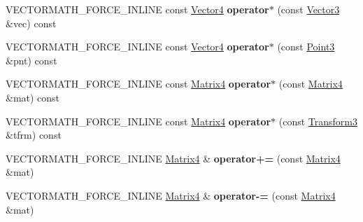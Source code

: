 \begin{DoxyCompactItemize}
\item 
\mbox{\label{classVectormath_1_1Aos_1_1Matrix4_a55560ef07894bfa1086be365141c36a2}} 
V\+E\+C\+T\+O\+R\+M\+A\+T\+H\+\_\+\+F\+O\+R\+C\+E\+\_\+\+I\+N\+L\+I\+NE const \hyperlink{classVectormath_1_1Aos_1_1Vector4}{Vector4} {\bfseries operator$\ast$} (const \hyperlink{classVectormath_1_1Aos_1_1Vector3}{Vector3} \&vec) const
\item 
\mbox{\label{classVectormath_1_1Aos_1_1Matrix4_a93c124a39005bbd334e6eb3840029d54}} 
V\+E\+C\+T\+O\+R\+M\+A\+T\+H\+\_\+\+F\+O\+R\+C\+E\+\_\+\+I\+N\+L\+I\+NE const \hyperlink{classVectormath_1_1Aos_1_1Vector4}{Vector4} {\bfseries operator$\ast$} (const \hyperlink{classVectormath_1_1Aos_1_1Point3}{Point3} \&pnt) const
\item 
\mbox{\label{classVectormath_1_1Aos_1_1Matrix4_ac56e1d468061f123e02d53616c4506d0}} 
V\+E\+C\+T\+O\+R\+M\+A\+T\+H\+\_\+\+F\+O\+R\+C\+E\+\_\+\+I\+N\+L\+I\+NE const \hyperlink{classVectormath_1_1Aos_1_1Matrix4}{Matrix4} {\bfseries operator$\ast$} (const \hyperlink{classVectormath_1_1Aos_1_1Matrix4}{Matrix4} \&mat) const
\item 
\mbox{\label{classVectormath_1_1Aos_1_1Matrix4_aa673b08395ec454d01dc87e260886ee9}} 
V\+E\+C\+T\+O\+R\+M\+A\+T\+H\+\_\+\+F\+O\+R\+C\+E\+\_\+\+I\+N\+L\+I\+NE const \hyperlink{classVectormath_1_1Aos_1_1Matrix4}{Matrix4} {\bfseries operator$\ast$} (const \hyperlink{classVectormath_1_1Aos_1_1Transform3}{Transform3} \&tfrm) const
\item 
\mbox{\label{classVectormath_1_1Aos_1_1Matrix4_ae838f4db3f02b98435768cc5a4f9b857}} 
V\+E\+C\+T\+O\+R\+M\+A\+T\+H\+\_\+\+F\+O\+R\+C\+E\+\_\+\+I\+N\+L\+I\+NE \hyperlink{classVectormath_1_1Aos_1_1Matrix4}{Matrix4} \& {\bfseries operator+=} (const \hyperlink{classVectormath_1_1Aos_1_1Matrix4}{Matrix4} \&mat)
\item 
\mbox{\label{classVectormath_1_1Aos_1_1Matrix4_a49551bcb4b568c7716133e30906336bd}} 
V\+E\+C\+T\+O\+R\+M\+A\+T\+H\+\_\+\+F\+O\+R\+C\+E\+\_\+\+I\+N\+L\+I\+NE \hyperlink{classVectormath_1_1Aos_1_1Matrix4}{Matrix4} \& {\bfseries operator-\/=} (const \hyperlink{classVectormath_1_1Aos_1_1Matrix4}{Matrix4} \&mat)

\end{DoxyCompactItemize}
